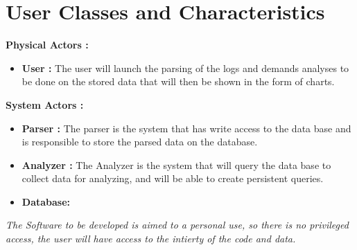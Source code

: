 \documentclass{scrreprt}
\begin{document}
\section{User Classes and Characteristics}

\textbf{Physical Actors :}\\
\begin{itemize}
 \item \textbf{User :} The user will launch the parsing of the logs and demands analyses to be done
   on the stored data that will then be shown in the form of charts.
\end{itemize}
\textbf{System Actors :}\\
\begin{itemize}
 \item \textbf{Parser :} The parser is the system that has write access to the data
   base and is responsible to store the parsed data on the database.
 \item \textbf{Analyzer :} The Analyzer is the system that will query the data
   base to collect data for analyzing, and will be able to create persistent queries.
   \item \textbf{Database: }
\end{itemize}

\textit{The Software to be developed is aimed to a personal use, so there is no privileged access, the user will have access to the intierty of the code and data.}
\end{document}

